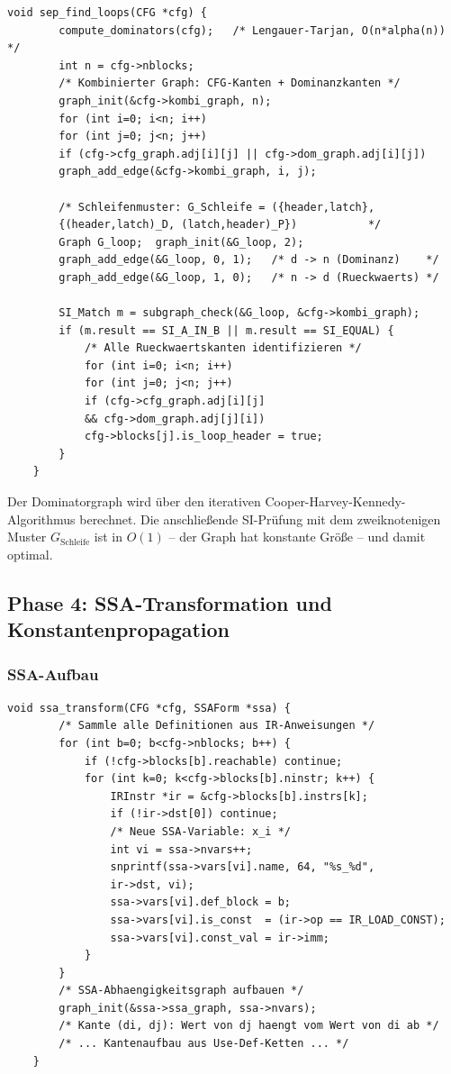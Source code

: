 ﻿\documentclass[a4paper,12pt]{article}
\theoremstyle{definition}
\begin{document}
\begin{lstlisting}[style=cstyle, caption={SEP -- kombinierter Graph und
		Schleifenmuster (compiler\_full.c)}, label=lst:sep-impl]
	void sep_find_loops(CFG *cfg) {
		compute_dominators(cfg);   /* Lengauer-Tarjan, O(n*alpha(n)) */
		int n = cfg->nblocks;
		/* Kombinierter Graph: CFG-Kanten + Dominanzkanten */
		graph_init(&cfg->kombi_graph, n);
		for (int i=0; i<n; i++)
		for (int j=0; j<n; j++)
		if (cfg->cfg_graph.adj[i][j] || cfg->dom_graph.adj[i][j])
		graph_add_edge(&cfg->kombi_graph, i, j);
		
		/* Schleifenmuster: G_Schleife = ({header,latch},
		{(header,latch)_D, (latch,header)_P})           */
		Graph G_loop;  graph_init(&G_loop, 2);
		graph_add_edge(&G_loop, 0, 1);   /* d -> n (Dominanz)    */
		graph_add_edge(&G_loop, 1, 0);   /* n -> d (Rueckwaerts) */
		
		SI_Match m = subgraph_check(&G_loop, &cfg->kombi_graph);
		if (m.result == SI_A_IN_B || m.result == SI_EQUAL) {
			/* Alle Rueckwaertskanten identifizieren */
			for (int i=0; i<n; i++)
			for (int j=0; j<n; j++)
			if (cfg->cfg_graph.adj[i][j]
			&& cfg->dom_graph.adj[j][i])
			cfg->blocks[j].is_loop_header = true;
		}
	}
\end{lstlisting}

Der Dominatorgraph wird über den iterativen Cooper-Harvey-Kennedy-Algorithmus
berechnet. Die anschließende SI-Prüfung mit dem
zweiknoten\-igen Muster $G_{\text{Schleife}}$ ist in $O(1)$ -- der Graph hat
konstante Größe -- und damit optimal.

\subsection{Phase 4: SSA-Transformation und Konstantenpropagation}
\label{sec:impl-cpp}

\subsubsection{SSA-Aufbau}

\begin{lstlisting}[style=cstyle, caption={SSA-Abhängigkeitsgraph
		(compiler\_full.c)}, label=lst:ssa-impl]
	void ssa_transform(CFG *cfg, SSAForm *ssa) {
		/* Sammle alle Definitionen aus IR-Anweisungen */
		for (int b=0; b<cfg->nblocks; b++) {
			if (!cfg->blocks[b].reachable) continue;
			for (int k=0; k<cfg->blocks[b].ninstr; k++) {
				IRInstr *ir = &cfg->blocks[b].instrs[k];
				if (!ir->dst[0]) continue;
				/* Neue SSA-Variable: x_i */
				int vi = ssa->nvars++;
				snprintf(ssa->vars[vi].name, 64, "%s_%d",
				ir->dst, vi);
				ssa->vars[vi].def_block = b;
				ssa->vars[vi].is_const  = (ir->op == IR_LOAD_CONST);
				ssa->vars[vi].const_val = ir->imm;
			}
		}
		/* SSA-Abhaengigkeitsgraph aufbauen */
		graph_init(&ssa->ssa_graph, ssa->nvars);
		/* Kante (di, dj): Wert von dj haengt vom Wert von di ab */
		/* ... Kantenaufbau aus Use-Def-Ketten ... */
	}
\end{lstlisting}
\end{document}
